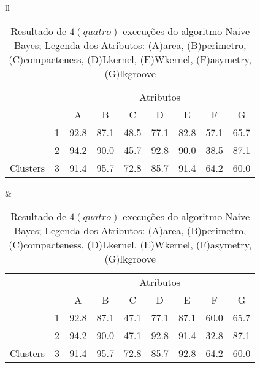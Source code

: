 \begin{table}[!h]
\caption{Resultado de ${4(quatro)}$ execuções do algoritmo Naive Bayes; Legenda dos Atributos: (A)area, (B)perimetro, (C)compacteness, (D)Lkernel, (E)Wkernel, (F)asymetry, (G)lkgroove}
 \begin{tabular}{ll}

  
   \small\addtolength{\tabcolsep}{-4pt}
     \begin{tabular}{|cl|c|c|c|c|c|c|c|}
        \hline \hline
                                 &   & \multicolumn{7}{c|}{Atributos}                                               \\ \cline{3-9} 
       \multicolumn{1}{|l}{}                            &   & A    & B & C & D & E & F & G \\ \hline
        \multicolumn{1}{|c|}{}                           & 1 & 92.8 & 87.1   & 48.5      & 77.1 & 82.8 & 57.1   & 65.7   \\ \cline{2-9} 
        \multicolumn{1}{|c|}{}                           & 2 & 94.2 & 90.0   & 45.7      & 92.8 & 90.0 & 38.5  & 87.1  \\ \cline{2-9} 
        \multicolumn{1}{|c|}{\multirow{-3}{*}{Clusters}} & 3 & 91.4 & 95.7   & 72.8      & 85.7 & 91.4 & 64.2  & 60.0  \\ \hline
      \end{tabular}
 &
 
   
   \small\addtolength{\tabcolsep}{-4pt}
   \begin{tabular}{|cl|c|c|c|c|c|c|c|}
        \hline \hline
                                 &   & \multicolumn{7}{c|}{Atributos}                                               \\ \cline{3-9} 
       \multicolumn{1}{|l}{}                            &   & A    & B & C & D & E & F & G \\ \hline
        \multicolumn{1}{|c|}{}                           & 1 & 92.8 & 87.1   & 47.1      & 77.1 & 87.1 & 60.0   & 65.7   \\ \cline{2-9} 
        \multicolumn{1}{|c|}{}                           & 2 & 94.2 & 90.0   & 47.1      & 92.8 & 91.4 & 32.8  & 87.1  \\ \cline{2-9} 
        \multicolumn{1}{|c|}{\multirow{-3}{*}{Clusters}} & 3 & 91.4 & 95.7   & 72.8      & 85.7 & 92.8 & 64.2  & 60.0  \\ \hline
      \end{tabular}
  \\  [8ex]
 

\end{tabular}
\end{table}
